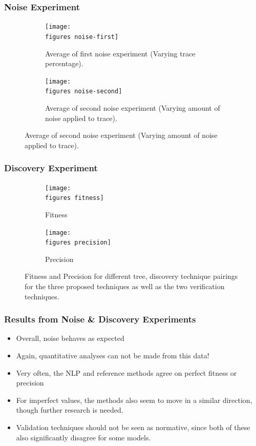 \documentclass{beamer}
\newcommand{\figures}{../figures/}
\begin{document}
	\begin{frame}
		\frametitle{Noise Experiment}
		\begin{figure}
			\centering
			\begin{subfigure}[b]{0.49\textwidth}
				\centering
				\texttt{[image: \\figures noise-first]}
				\caption{Average of first noise experiment (Varying trace percentage).}
				\label{fig:noise-first}
			\end{subfigure}
			\hfill
			\begin{subfigure}[b]{0.49\textwidth}
				\centering
				\texttt{[image: \\figures noise-second]}
				\caption{Average of second noise experiment (Varying amount of noise applied to trace).}
				\label{fig:noise-second}
			\end{subfigure}
		\end{figure}
	\end{frame}
	
	
	\begin{frame}
		\frametitle{Discovery Experiment}
		\begin{figure}
			\centering
			\begin{subfigure}[b]{0.49\textwidth}
				\centering
				\texttt{[image: \\figures fitness]}
				\caption{Fitness}
				\label{fig:fitness}
			\end{subfigure}
			\hfill
			\begin{subfigure}[b]{0.49\textwidth}
				\centering
				\texttt{[image: \\figures precision]}
				\caption{Precision}
				\label{fig:precision}
			\end{subfigure}
			\caption{Fitness and Precision for different tree, discovery technique pairings for the three proposed techniques as well as the two verification techniques.}
			\label{fig:discovery}
		\end{figure}
	\end{frame}
	
	\begin{frame}
		\frametitle{Results from Noise \& Discovery Experiments}
		\begin{itemize}
			\item Overall, noise behaves as expected
			\item Again, quantitative analyses can not be made from this data!
			\item Very often, the NLP and reference methods agree on perfect fitness or precision
			\item For imperfect values, the methods also seem to move in a similar direction, though further research is needed.
			\item Validation techniques should not be seen as normative, since both of these also significantly disagree for some models. 
		\end{itemize}
	\end{frame}
	
\end{document}
